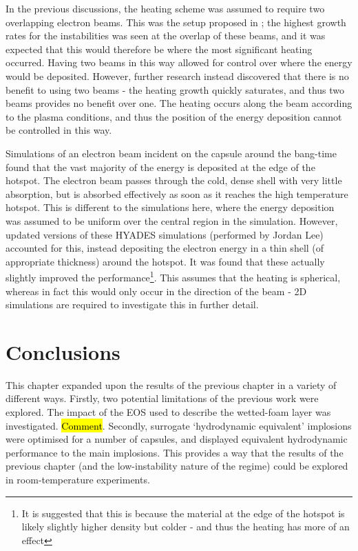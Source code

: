 In the previous discussions, the heating scheme was assumed to require two overlapping electron beams. This was the setup proposed in \cite{Ratan2017}; the highest growth rates for the instabilities was seen at the overlap of these beams, and it was expected that this would therefore be where the most significant heating occurred. Having two beams in this way allowed for control over where the energy would be deposited. However, further research instead discovered that there is no benefit to using two beams - the heating growth quickly saturates, and thus two beams provides no benefit over one. The heating occurs along the beam according to the plasma conditions, and thus the position of the energy deposition cannot be controlled in this way.

Simulations of an electron beam incident on the capsule around the bang-time found that the vast majority of the energy is deposited at the edge of the hotspot. The electron beam passes through the cold, dense shell with very little absorption, but is absorbed effectively as soon as it reaches the high temperature hotspot. This is different to the simulations here, where the energy deposition was assumed to be uniform over the central region in the simulation. However, updated versions of these HYADES simulations (performed by Jordan Lee) accounted for this, instead depositing the electron energy in a thin shell (of appropriate thickness) around the hotspot. It was found that these actually slightly improved the performance\footnote{It is suggested that this is because the material at the edge of the hotspot is likely slightly higher density but colder - and thus the heating has more of an effect}. This assumes that the heating is spherical, whereas in fact this would only occur in the direction of the beam - 2D simulations are required to investigate this in further detail.

\section{Conclusions}
This chapter expanded upon the results of the previous chapter in a variety of different ways. Firstly, two potential limitations of the previous work were explored. The impact of the EOS used to describe the wetted-foam layer was investigated. \hl{Comment}. Secondly, surrogate `hydrodynamic equivalent' implosions were optimised for a number of capsules, and displayed equivalent hydrodynamic performance to the main implosions. This provides a way that the results of the previous chapter (and the low-instability nature of the regime) could be explored in room-temperature experiments.

